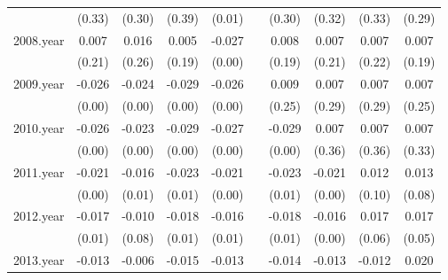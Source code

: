 {\begin{tabular}{l*{9}{c}}
          &   (0.33)         &   (0.30)         &   (0.39)         &   (0.01)         &                  &   (0.30)         &   (0.32)         &   (0.33)         &   (0.29)         \\
[1em]
2008.year &    0.007         &    0.016         &    0.005         &   -0.027\sym{**} &                  &    0.008         &    0.007         &    0.007         &    0.007         \\
          &   (0.21)         &   (0.26)         &   (0.19)         &   (0.00)         &                  &   (0.19)         &   (0.21)         &   (0.22)         &   (0.19)         \\
[1em]
2009.year &   -0.026\sym{**} &   -0.024\sym{***}&   -0.029\sym{**} &   -0.026\sym{**} &                  &    0.009         &    0.007         &    0.007         &    0.007         \\
          &   (0.00)         &   (0.00)         &   (0.00)         &   (0.00)         &                  &   (0.25)         &   (0.29)         &   (0.29)         &   (0.25)         \\
[1em]
2010.year &   -0.026\sym{***}&   -0.023\sym{***}&   -0.029\sym{**} &   -0.027\sym{***}&                  &   -0.029\sym{**} &    0.007         &    0.007         &    0.007         \\
          &   (0.00)         &   (0.00)         &   (0.00)         &   (0.00)         &                  &   (0.00)         &   (0.36)         &   (0.36)         &   (0.33)         \\
[1em]
2011.year &   -0.021\sym{**} &   -0.016\sym{**} &   -0.023\sym{**} &   -0.021\sym{**} &                  &   -0.023\sym{**} &   -0.021\sym{**} &    0.012         &    0.013         \\
          &   (0.00)         &   (0.01)         &   (0.01)         &   (0.00)         &                  &   (0.01)         &   (0.00)         &   (0.10)         &   (0.08)         \\
[1em]
2012.year &   -0.017\sym{**} &   -0.010         &   -0.018\sym{**} &   -0.016\sym{**} &                  &   -0.018\sym{*}  &   -0.016\sym{**} &    0.017         &    0.017\sym{*}  \\
          &   (0.01)         &   (0.08)         &   (0.01)         &   (0.01)         &                  &   (0.01)         &   (0.00)         &   (0.06)         &   (0.05)         \\
[1em]
2013.year &   -0.013\sym{**} &   -0.006         &   -0.015\sym{*}  &   -0.013\sym{**} &                  &   -0.014\sym{*}  &   -0.013\sym{**} &   -0.012\sym{**} &    0.020\sym{*}  \\

\end{tabular}}
